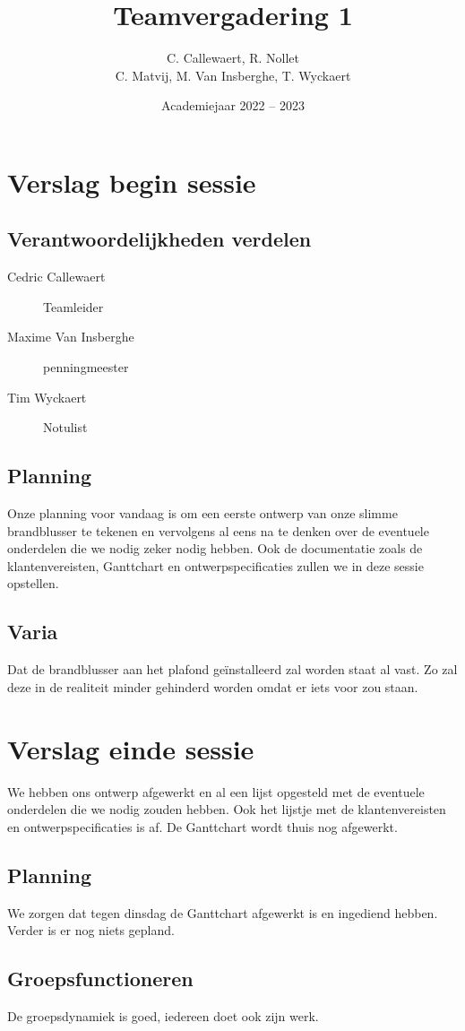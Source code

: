 \documentclass{kulakarticle}
\title{Teamvergadering 1}
\author{C. Callewaert, R. Nollet \\
	C. Matvij, M. Van Insberghe, T. Wyckaert }
\date{Academiejaar 2022 -- 2023}
\begin{document}
	\maketitle
	\section{Verslag begin sessie}
	\subsection{Verantwoordelijkheden verdelen}

	\begin{description}
		\item[Cedric Callewaert]	 Teamleider
		\item[Maxime Van Insberghe]	 penningmeester
		\item[Tim Wyckaert]	 Notulist 
		
	\end{description}

	\subsection{Planning}
	Onze planning voor vandaag is om een eerste ontwerp van onze slimme brandblusser te tekenen en vervolgens al eens na te denken over de eventuele onderdelen die we nodig zeker nodig hebben.
	Ook de documentatie zoals de klantenvereisten, Ganttchart en ontwerpspecificaties zullen we in deze sessie opstellen.
	

	\subsection{Varia}
	Dat de brandblusser aan het plafond geïnstalleerd zal worden staat al vast. Zo zal deze in de realiteit minder gehinderd worden omdat er iets voor zou staan.
	
	\section{Verslag einde sessie}
	We hebben ons ontwerp afgewerkt en al een lijst opgesteld met de eventuele onderdelen die we nodig zouden hebben. Ook het lijstje met de klantenvereisten en ontwerpspecificaties is af. De Ganttchart wordt thuis nog afgewerkt. 
	\subsection{Planning} We zorgen dat tegen dinsdag de Ganttchart  afgewerkt is  en ingediend hebben. Verder is er nog niets gepland.

	\subsection{Groepsfunctioneren} De groepsdynamiek is goed, iedereen doet ook zijn werk.

	

	
\end{document}
